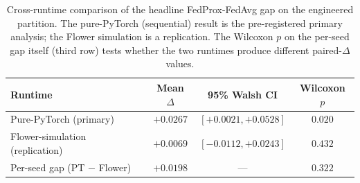 \begin{table}[!htbp]
\centering
\small
\caption{Cross-runtime comparison of the headline FedProx-FedAvg gap on the engineered partition. The pure-PyTorch (sequential) result is the pre-registered primary analysis; the Flower simulation is a replication. The Wilcoxon $p$ on the per-seed gap itself (third row) tests whether the two runtimes produce different paired-$\Delta$ values.}
\label{tab:cross-runtime}
\begin{tabular}{l c c c}
\toprule
Runtime & Mean $\Delta$ & 95\% Walsh CI & Wilcoxon $p$ \\
\midrule
Pure-PyTorch (primary)         & $+0.0267$ & $[+0.0021, +0.0528]$ & $\mathbf{0.020}$ \\
Flower-simulation (replication) & $+0.0069$ & $[-0.0112, +0.0243]$ & $0.432$ \\
\midrule
Per-seed gap (PT $-$ Flower)    & $+0.0198$ & --- & $0.322$ \\
\bottomrule
\end{tabular}
\end{table}
